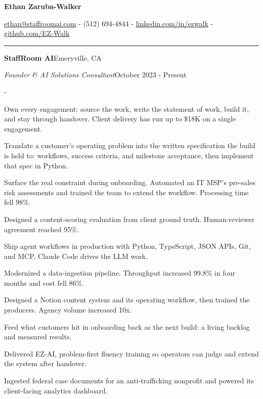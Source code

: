 \documentclass[10pt,letterpaper]{article}
\newenvironment{cvitems}{%
  \begin{list}{-}{%
    \setlength{\leftmargin}{12pt}%
    \setlength{\itemsep}{1.2pt}%
    \setlength{\parsep}{0pt}%
    \setlength{\topsep}{1.5pt}%
    \setlength{\partopsep}{0pt}%
    \setlength{\labelwidth}{6pt}%
    \setlength{\labelsep}{6pt}%
    \setlength{\itemindent}{0pt}%
  }%
}{\end{list}}
\newcommand{\cvsection}[1]{%
  \vspace{7pt}%
  \noindent{\bfseries\fontsize{11pt}{13pt}\selectfont\MakeUppercase{#1}}\par
  \vspace{1pt}%
  \noindent\rule{\textwidth}{0.4pt}\par
  \vspace{4pt}%
}
\newcommand{\cventryhead}[4]{%
  \noindent\textbf{#1}\hfill#2\par
  \vspace{0.5pt}%
  \noindent\textit{#3}\hfill#4\par
}
\begin{document}
\begin{center}
  {\bfseries\fontsize{22pt}{24pt}\selectfont Ethan Zaruba-Walker\par}
  \vspace{4pt}
  {\fontsize{10pt}{12pt}\selectfont
    \href{mailto:ethan@staffroomai.com}{ethan@staffroomai.com}
    {-}
    (512) 694-4844
    {-}
    \href{https://linkedin.com/in/ezwalk}{linkedin.com/in/ezwalk}
    {-}
    \href{https://github.com/EZ-Walk}{github.com/EZ-Walk}\par}
\end{center}
\vspace{2pt}

\cvsection{Experience}

\cventryhead{StaffRoom AI}{Emeryville, CA}
{Founder \& AI Solutions Consultant}{October 2023 - Present}
\begin{cvitems}
  \item Own every engagement: source the work, write the statement of work, build it, and stay through handover. Client delivery has run up to \$18K on a single engagement.
  \item Translate a customer's operating problem into the written specification the build is held to: workflows, success criteria, and milestone acceptance, then implement that spec in Python.
  \item Surface the real constraint during onboarding. Automated an IT MSP's pre-sales risk assessments and trained the team to extend the workflow. Processing time fell 98\%.
  \item Designed a content-scoring evaluation from client ground truth. Human-reviewer agreement reached 95\%.
  \item Ship agent workflows in production with Python, TypeScript, JSON APIs, Git, and MCP. Claude Code drives the LLM work.
  \item Modernized a data-ingestion pipeline. Throughput increased 99.8\% in four months and cost fell 86\%.
  \item Designed a Notion content system and its operating workflow, then trained the producers. Agency volume increased 10x.
  \item Feed what customers hit in onboarding back as the next build: a living backlog and measured results.
  \item Delivered EZ-AI, problem-first fluency training so operators can judge and extend the system after handover.
  \item Ingested federal case documents for an anti-trafficking nonprofit and powered its client-facing analytics dashboard.
\end{cvitems}
\end{document}
